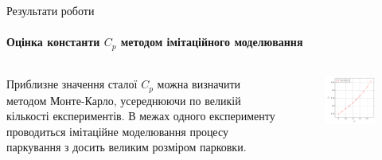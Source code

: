 \begin{frame}{Результати роботи}
\framesubtitle{Оцінка константи $C_{p}$ методом імітаційного моделювання}
\begin{columns}
	\begin{column}{0.5\textwidth}
		Приблизне значення сталої $C_{p}$ можна визначити методом Монте-Карло, усереднюючи по великій кількості експериментів. В межах одного експерименту проводиться імітаційне моделювання процесу паркування з досить великим розміром парковки.
	\end{column}
	\begin{column}{0.5\textwidth}
		\begin{figure}
			\centering
			\includegraphics[scale=0.5]{im/simul_cp}
		\end{figure}
	\end{column}
\end{columns}
\end{frame}

